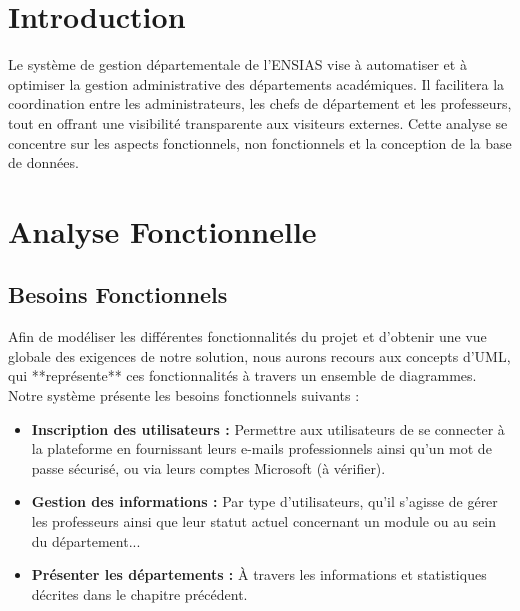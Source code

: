 \section{Introduction}
Le système de gestion départementale de l'ENSIAS vise à automatiser et à optimiser la gestion administrative des départements académiques. Il facilitera la coordination entre les administrateurs, les chefs de département et les professeurs, tout en offrant une visibilité transparente aux visiteurs externes. Cette analyse se concentre sur les aspects fonctionnels, non fonctionnels et la conception de la base de données.

\newpage

\section{Analyse Fonctionnelle}
\subsection{Besoins Fonctionnels}
Afin de modéliser les différentes fonctionnalités du projet et d'obtenir une vue globale des exigences de notre solution, nous aurons recours aux concepts d'UML, qui **représente** ces fonctionnalités à travers un ensemble de diagrammes. Notre système présente les besoins fonctionnels suivants :
\begin{itemize}
    \item \textbf{Inscription des utilisateurs :} Permettre aux utilisateurs de se connecter à la plateforme en fournissant leurs e-mails professionnels ainsi qu'un mot de passe sécurisé, ou via leurs comptes Microsoft (à vérifier).
    \item \textbf{Gestion des informations :} Par type d'utilisateurs, qu'il s'agisse de gérer les professeurs ainsi que leur statut actuel concernant un module ou au sein du département...
    \item \textbf{Présenter les départements :} À travers les informations et statistiques décrites dans le chapitre précédent.
\end{itemize}



